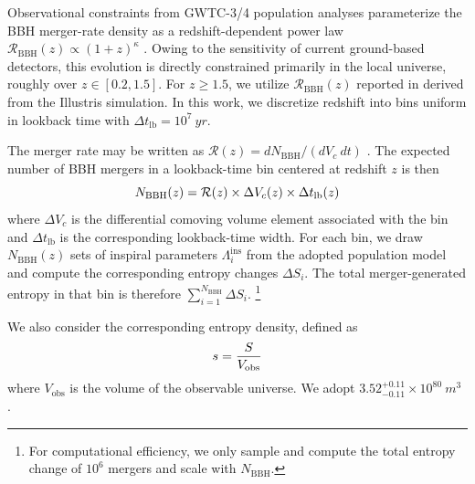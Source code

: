 \documentclass[twocolumn]{aastex631}
\begin{document}
\label{subsec:mergerrate}
Observational constraints from GWTC-3/4 population analyses parameterize the BBH merger-rate density as a redshift-dependent power law $\mathcal{R}_\mathrm{BBH}(z) \propto (1+z)^\kappa$ \citep{gwtc-3-pop, gwtc4pop}. Owing to the sensitivity of current ground-based detectors, this evolution is directly constrained primarily in the local universe, roughly over $z \in [0.2, 1.5]$. For $z \ge 1.5$, we utilize $\mathcal{R}_\mathrm{BBH}(z)$ reported in \cite{Mapelli_2018} derived from the Illustris simulation. In this work, we discretize redshift into bins uniform in lookback time with $\Delta t_\mathrm{lb}= 10^7~yr$. 

The merger rate may be written as $\mathcal{R}(z) = dN_\mathrm{BBH}/(dV_c~dt)$ \citep{Mandel_2022, gwtc-3-pop}. The expected number of BBH mergers in a lookback-time bin centered at redshift $z$ is then
\begin{equation}
    \centering
    \label{eq:growth}
    N_\mathrm{BBH}(z) = \mathcal{R}(z) \times \Delta V_c(z) \times \Delta t_\mathrm{lb}(z)
\end{equation}
where $\Delta V_c$ is the differential comoving volume element associated with the bin and $\Delta t_\mathrm{lb}$ is the corresponding lookback-time width. For each bin, we draw $N_\mathrm{BBH}(z)$ sets of inspiral parameters $\Lambda^\mathrm{ins}_i$ from the adopted population model and compute the corresponding entropy changes $\Delta S_i$. The total merger-generated entropy in that bin is therefore $\sum_{i=1}^{N_\mathrm{BBH}} \Delta S_i$. \footnote{For computational efficiency, we only sample and compute the total entropy change of $10^6$ mergers and scale with $N_\mathrm{BBH}$.}

We also consider the corresponding entropy density, defined as
\begin{equation}
    \centering
    s = \frac{S}{V_\mathrm{obs}}
    \label{eq:density}
\end{equation}
where $V_\mathrm{obs}$ is the volume of the observable universe. We adopt $3.52^{+0.11}_{-0.11} \times 10^{80}~m^3$ \citep{profumo2024newcensusuniversesentropy}. %
\end{document}
